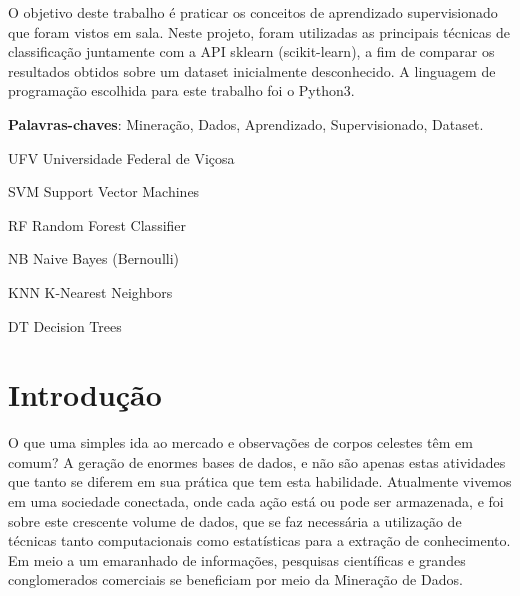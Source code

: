\documentclass[
	12pt,				    %
	openright,			    %
	oneside,			    %
	a4paper,			    %
    sumario=tradicional,    %
	english,			    %
	brazil,				    %
	]{abntex2}
\begin{document}
\frenchspacing

\pretextual

\imprimircapa



\begin{resumo}
 \noindent
O objetivo deste trabalho é praticar os conceitos de aprendizado supervisionado que foram vistos em sala. Neste projeto, foram utilizadas as principais técnicas de classificação juntamente com a API sklearn (scikit-learn), a fim de comparar os resultados obtidos sobre um dataset inicialmente desconhecido. A linguagem de programação escolhida para este trabalho foi o Python3.
 \vspace{\onelineskip}

 \noindent
 \textbf{Palavras-chaves}: Mineração, Dados, Aprendizado, Supervisionado, Dataset.
\end{resumo}


\begin{siglas}
\item[UFV] Universidade Federal de Viçosa
\item[SVM] Support Vector Machines
\item[RF] Random Forest Classifier
\item[NB] Naive Bayes (Bernoulli)
\item[KNN] K-Nearest Neighbors
\item[DT] Decision Trees
\end{siglas}

\tableofcontents*
\cleardoublepage



\textual


\chapter{Introdução}\label{sec:introducao}
O que uma simples ida ao mercado e observações de corpos celestes têm em comum? A geração de enormes bases de dados, e não são apenas estas atividades que tanto se diferem em sua prática que tem esta habilidade. Atualmente vivemos em uma sociedade conectada, onde cada ação está ou pode ser armazenada, e foi sobre este crescente volume de dados, que se faz necessária a utilização de técnicas tanto computacionais como estatísticas para a extração de conhecimento. Em meio a um emaranhado de informações, pesquisas científicas e grandes conglomerados comerciais se beneficiam por meio da Mineração de Dados. 
\end{document}
